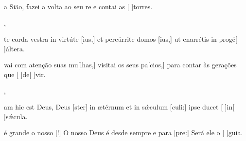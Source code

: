 {    {\item {} a Sião, fazei a volta ao seu re e contai as [ ]{tor}res.~\Antiphona},
  {\item {}te corda vestra in virtúte [ius,] et percúrrite domos [ius,] ut enarrétis in progé[ ]{ál}tera.~\Antiphona}%
    {\item {}vai com atenção suas mu[lhas,] visitai os seus pa[cios,] para contar às gerações que [ ]{de}[ ]{vir}.~\Antiphona},
  {\item {}am hic est Deus, Deus [ster] in ætérnum et in sǽculum [culi:] ipse ducet [ ]{in}[ ]{sǽ}cula.~\Antiphona}%
    {\item {} é grande o nosso [!] O nosso Deus é desde sempre e para [pre:] Será ele o [ ]{gui}a.~\Antiphona}
}